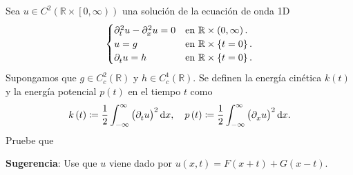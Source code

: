 Sea $u\in C^{2}\left(\mathbb{R}\times\left[0,\infty\right)\right)$
una solución de la ecuación de onda 1D
\begin{equation*}
	\begin{cases}
		\difcp[2]{u}{t}-
		\difcp[2]{u}{x}=0 &
		\text{en }\mathbb{R}\times\left(0,\infty\right). \\
		u=g               &
		\text{en }\mathbb{R}\times\left\{t=0\right\}.    \\
		\difcp{u}{t}=h    &
		\text{en }\mathbb{R}\times\left\{t=0\right\}.
	\end{cases}
\end{equation*}
Supongamos que $g\in C^{2}_{c}\left(\mathbb{R}\right)$ y
$h\in C^{1}_{c}\left(\mathbb{R}\right)$.
Se definen la energía cinética $k\left(t\right)$ y la energía
potencial $p\left(t\right)$ en el tiempo $t$ como
\begin{equation*}
	k\left(t\right)\coloneqq
	\frac{1}{2}
	\int_{-\infty}^{\infty}
	{\left(\difcp{u}{t}\right)}^{2}\dl x,\quad
	p\left(t\right)\coloneqq
	\frac{1}{2}
	\int_{-\infty}^{\infty}
	{\left(\difcp{u}{x}\right)}^{2}
	\dl x.
\end{equation*}
Pruebe que
\begin{multicols}{2}
\end{multicols}
\textbf{Sugerencia}: Use que $u$ viene dado por
$u\left(x,t\right)=F\left(x+t\right)+G\left(x-t\right)$.

\question

